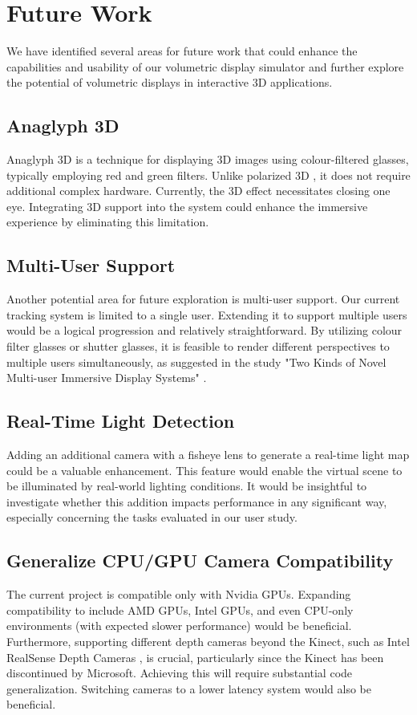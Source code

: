 \section{Future Work}

We have identified several areas for future work that could enhance the capabilities and usability of our volumetric display simulator and further explore the potential of volumetric displays in interactive 3D applications.

\subsection{Anaglyph 3D}
Anaglyph 3D \cite{Dhaou2019} is a technique for displaying 3D images using colour-filtered glasses, typically employing red and green filters. Unlike polarized 3D \cite{article-3D}, it does not require additional complex hardware. Currently, the 3D effect necessitates closing one eye. Integrating 3D support into the system could enhance the immersive experience by eliminating this limitation.

\subsection{Multi-User Support}
Another potential area for future exploration is multi-user support. Our current tracking system is limited to a single user. Extending it to support multiple users would be a logical progression and relatively straightforward. By utilizing colour filter glasses or shutter glasses, it is feasible to render different perspectives to multiple users simultaneously, as suggested in the study "Two Kinds of Novel Multi-user Immersive Display Systems" \cite{Two-Kinds}.

\subsection{Real-Time Light Detection}
Adding an additional camera with a fisheye lens to generate a real-time light map could be a valuable enhancement. This feature would enable the virtual scene to be illuminated by real-world lighting conditions. It would be insightful to investigate whether this addition impacts performance in any significant way, especially concerning the tasks evaluated in our user study.

\subsection{Generalize CPU/GPU Camera Compatibility}
The current project is compatible only with Nvidia GPUs. Expanding compatibility to include AMD GPUs, Intel GPUs, and even CPU-only environments (with expected slower performance) would be beneficial. Furthermore, supporting different depth cameras beyond the Kinect, such as Intel RealSense Depth Cameras \cite{keselman2017intel}, is crucial, particularly since the Kinect has been discontinued by Microsoft. Achieving this will require substantial code generalization. Switching cameras to a lower latency system would also be beneficial.

